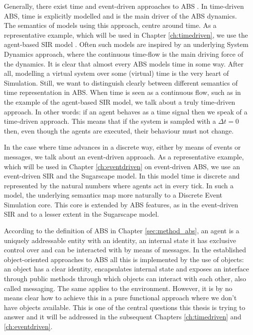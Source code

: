 Generally, there exist time and event-driven approaches to ABS \cite{meyer_event-driven_2014}. In time-driven ABS, time is explicitly modelled and is the main driver of the ABS dynamics. The semantics of models using this approach, centre around time. As a representative example, which will be used in Chapter \ref{ch:timedriven}, we use the agent-based SIR model \cite{macal_agent-based_2010, thaler_pure_2018}. Often such models are inspired by an underlying System Dynamics approach, where the continuous time-flow is the main driving force of the dynamics. It is clear that almost every ABS models time in some way. After all, modelling a virtual system over some (virtual) time is the very heart of Simulation. Still, we want to distinguish clearly between different semantics of time representation in ABS. When time is seen as a continuous flow, such as in the example of the agent-based SIR model, we talk about a truly time-driven approach. In other words: if an agent behaves as a time signal then we speak of a time-driven approach. This means that if the system is sampled with a $\Delta t = 0$ then, even though the agents are executed, their behaviour must not change.

In the case where time advances in a discrete way, either by means of events or messages, we talk about an event-driven approach. As a representative example, which will be used in Chapter \ref{ch:eventdriven} on event-driven ABS, we use an event-driven SIR and the Sugarscape model. In this model time is discrete and represented by the natural numbers where agents act in every tick. In such a model, the underlying semantics map more naturally to a Discrete Event Simulation core. This core is extended by ABS features, as in the event-driven SIR and to a lesser extent in the Sugarscape model.

According to the definition of ABS in  Chapter \ref{sec:method_abs}, an agent is a uniquely addressable entity with an identity, an internal state it has exclusive control over and can be interacted with by means of messages. In the established object-oriented approaches to ABS all this is implemented by the use of objects: an object has a clear identity, encapsulates internal state and exposes an interface through public methods through which objects can interact with each other, also called messaging. The same applies to the environment. However, it is by no means clear how to achieve this in a pure functional approach where we don't have objects available. This is one of the central questions this thesis is trying to answer and it will be addressed in the subsequent Chapters \ref{ch:timedriven} and \ref{ch:eventdriven}.

